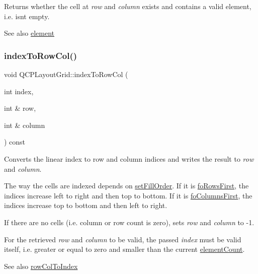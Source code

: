 Returns whether the cell at {\itshape row} and {\itshape column} exists and contains a valid element, i.\+e. isn\textquotesingle{}t empty.

\begin{DoxySeeAlso}{See also}
\hyperlink{class_q_c_p_layout_grid_a602b426609b4411cf6a93c3ddf3a381a}{element} 
\end{DoxySeeAlso}
\mbox{\label{class_q_c_p_layout_grid_a577223db920e2acb34bc1091080c76d1}} 
\subsubsection{\texorpdfstring{index\+To\+Row\+Col()}{indexToRowCol()}}
{\footnotesize\ttfamily void Q\+C\+P\+Layout\+Grid\+::index\+To\+Row\+Col (\begin{DoxyParamCaption}\item[{int}]{index,  }\item[{int \&}]{row,  }\item[{int \&}]{column }\end{DoxyParamCaption}) const}

Converts the linear index to row and column indices and writes the result to {\itshape row} and {\itshape column}.

The way the cells are indexed depends on \hyperlink{class_q_c_p_layout_grid_affc2f3cfd22f28698c5b29b960d2a391}{set\+Fill\+Order}. If it is \hyperlink{class_q_c_p_layout_grid_a7d49ee08773de6b2fd246edfed353ccaa0202730954e26c474cc820164aedce3e}{fo\+Rows\+First}, the indices increase left to right and then top to bottom. If it is \hyperlink{class_q_c_p_layout_grid_a7d49ee08773de6b2fd246edfed353ccaac4cb4b796ec4822d5894b47b51627fb3}{fo\+Columns\+First}, the indices increase top to bottom and then left to right.

If there are no cells (i.\+e. column or row count is zero), sets {\itshape row} and {\itshape column} to -\/1.

For the retrieved {\itshape row} and {\itshape column} to be valid, the passed {\itshape index} must be valid itself, i.\+e. greater or equal to zero and smaller than the current \hyperlink{class_q_c_p_layout_grid_a9a8942aface780a02445ebcf14c48513}{element\+Count}.

\begin{DoxySeeAlso}{See also}
\hyperlink{class_q_c_p_layout_grid_a682ba76f130810ffd294032a1bfbcfcb}{row\+Col\+To\+Index} 
\end{DoxySeeAlso}
\mbox{\label{class_q_c_p_layout_grid_a1e880a321dbe8b43b471ccd764433dc4}} 
